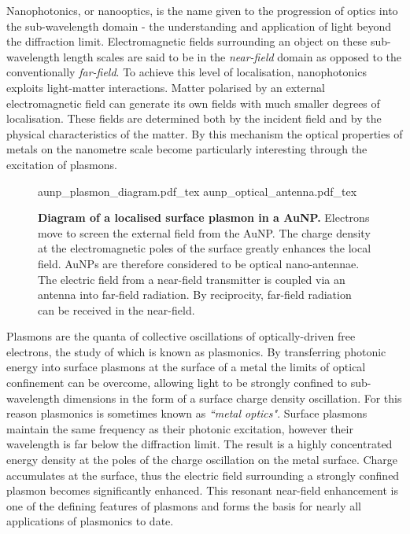 \documentclass[12pt, a4paper, twoside]{book}
\begin{document}
Nanophotonics, or nanooptics, is the name given to the progression of optics into the sub-wavelength domain - the understanding and application of light beyond the diffraction limit. Electromagnetic fields surrounding an object on these sub-wavelength length scales are said to be in the \emph{near-field} domain as opposed to the conventionally \emph{far-field}. To achieve this level of localisation, nanophotonics exploits light-matter interactions. Matter polarised by an external electromagnetic field can generate its own fields with much smaller degrees of localisation. These fields are determined both by the incident field and by the physical characteristics of the matter. By this mechanism the optical properties of metals on the nanometre scale become particularly interesting through the excitation of plasmons.

\begin{figure}[bt]
\centering
\fontsize{10pt}{1em}\selectfont
\def\svgwidth{0.6\textwidth}
{aunp_plasmon_diagram.pdf_tex}
\def\svgwidth{0.35\textwidth}
{aunp_optical_antenna.pdf_tex}
\caption[Diagram of a localised surface plasmon in a AuNP.]{\textbf{Diagram of a localised surface plasmon in a AuNP.} Electrons move to screen the external field from the AuNP. The charge density at the electromagnetic poles of the surface greatly enhances the local field. AuNPs are therefore considered to be optical nano-antennae. The electric field from a near-field transmitter is coupled via an antenna into far-field radiation. By reciprocity, far-field radiation can be received in the near-field.}
\label{fig:aunp_plasmon}
\end{figure}

Plasmons are the quanta of collective oscillations of optically-driven free electrons, the study of which is known as plasmonics. By transferring photonic energy into surface plasmons at the surface of a metal the limits of optical confinement can be overcome, allowing light to be strongly confined to sub-wavelength dimensions in the form of a surface charge density oscillation. For this reason plasmonics is sometimes known as \emph{``metal optics"}. Surface plasmons maintain the same frequency as their photonic excitation, however their wavelength is far below the diffraction limit. The result is a highly concentrated energy density at the poles of the charge oscillation on the metal surface. Charge accumulates at the surface, thus the electric field surrounding a strongly confined plasmon becomes significantly enhanced. This resonant near-field enhancement is one of the defining features of plasmons and forms the basis for nearly all applications of plasmonics to date.
\end{document}
